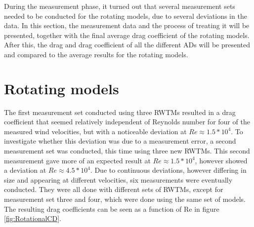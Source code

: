
During the measurement phase, it turned out that several measurement sets needed to be conducted for the rotating models, due to several deviations in the data. In this section, the measurement data and the process of treating it will be presented, together with the final average drag coefficient of the rotating models. After this, the drag and drag coefficient of all the different \gls{AD}s will be presented and compared to the average results for the rotating models.  



\section{Rotating models}

The first measurement set conducted using three \gls{RWTM}s resulted in a drag coefficient that seemed relatively independent of Reynolds number for four of the measured wind velocities, but with a noticeable deviation at $Re \approx 1.5*10^4$. To investigate whether this deviation was due to a measurement error, a second measurement set was conducted, this time using three new \gls{RWTM}s. This second measurement gave more of an expected result at $Re \approx 1.5*10^4$, however showed a deviation at $Re \approx 4.5*10^4$. Due to continuous deviations, however differing in size and appearing at different velocities, six measurements were eventually conducted. They were all done with different sets of \gls{RWTM}s, except for measurement set three and four, which were done using the same set of models. The resulting drag coefficients can be seen as a function of Re in figure \ref{fig:RotationalCD}.

 

